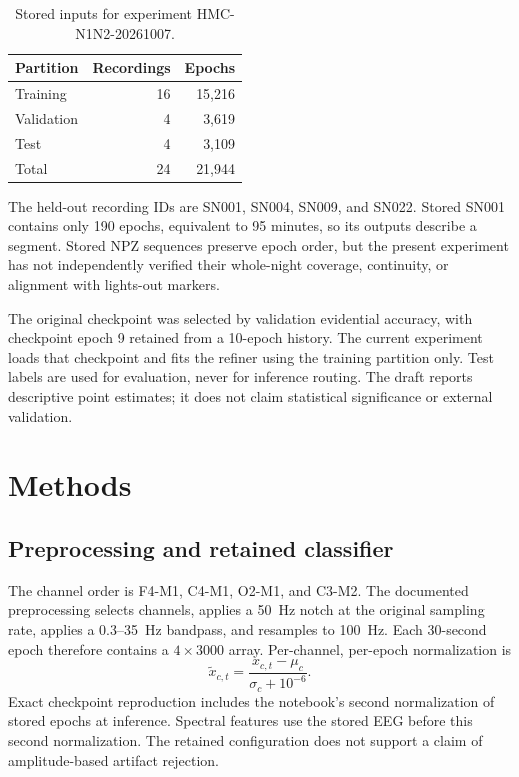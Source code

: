 \documentclass[pdflatex,sn-mathphys-num]{sn-jnl}
\begin{document}
\begin{table}[htbp]
\caption{Stored inputs for experiment HMC-N1N2-20261007.}\label{tab:split}
\centering
\begin{tabular}{lrr}
\toprule
Partition & Recordings & Epochs \\
\midrule
Training & 16 & 15,216 \\
Validation & 4 & 3,619 \\
Test & 4 & 3,109 \\
\midrule
Total & 24 & 21,944 \\
\bottomrule
\end{tabular}
\end{table}

The held-out recording IDs are SN001, SN004, SN009, and SN022. Stored SN001 contains only 190 epochs, equivalent to 95 minutes, so its outputs describe a segment. Stored NPZ sequences preserve epoch order, but the present experiment has not independently verified their whole-night coverage, continuity, or alignment with lights-out markers.

The original checkpoint was selected by validation evidential accuracy, with checkpoint epoch 9 retained from a 10-epoch history. The current experiment loads that checkpoint and fits the refiner using the training partition only. Test labels are used for evaluation, never for inference routing. The draft reports descriptive point estimates; it does not claim statistical significance or external validation.

\section{Methods}\label{sec:methods}
\subsection{Preprocessing and retained classifier}
The channel order is F4-M1, C4-M1, O2-M1, and C3-M2. The documented preprocessing selects channels, applies a 50~Hz notch at the original sampling rate, applies a 0.3--35~Hz bandpass, and resamples to 100~Hz. Each 30-second epoch therefore contains a $4\times3000$ array. Per-channel, per-epoch normalization is
\begin{equation}
 \widetilde{x}_{c,t}=\frac{x_{c,t}-\mu_c}{\sigma_c+10^{-6}}.
\end{equation}
Exact checkpoint reproduction includes the notebook's second normalization of stored epochs at inference. Spectral features use the stored EEG before this second normalization. The retained configuration does not support a claim of amplitude-based artifact rejection.
\end{document}
